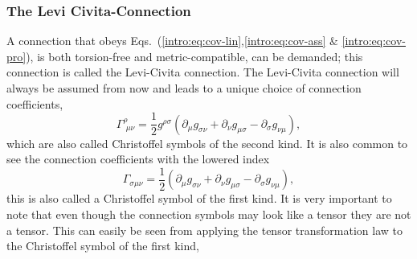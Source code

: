 \subsubsection{The Levi Civita-Connection}
A connection that obeys Eqs.~(\ref{intro:eq:cov-lin},\ref{intro:eq:cov-ass} $\&$ \ref{intro:eq:cov-pro}), is both torsion-free and metric-compatible, can be demanded; this connection is called the Levi-Civita connection. The Levi-Civita connection will always be assumed from now and leads to a unique choice of connection coefficients,
\begin{equation} \label{intro:eq:christoffel_def}
\Gamma^\rho_{\,\,\mu\nu} = \frac{1}{2}g^{\rho\sigma} ( \partial_{\mu} g_{\sigma\nu} + \partial_{\nu} g_{\mu\sigma} - \partial_{\sigma} g_{\nu\mu} ),
\end{equation}
which are also called Christoffel symbols of the second kind. It is also common to see the connection coefficients with the lowered index
\begin{equation}
\Gamma_{\sigma\mu\nu} = \frac{1}{2}( \partial_{\mu} g_{\sigma\nu} + \partial_{\nu} g_{\mu\sigma} - \partial_{\sigma} g_{\nu\mu} ),
\end{equation}
this is also called a Christoffel symbol of the first kind. It is very important to note that even though the connection symbols may look like a tensor they are not a tensor. This can easily be seen from applying the tensor transformation law to the Christoffel symbol of the first kind,
